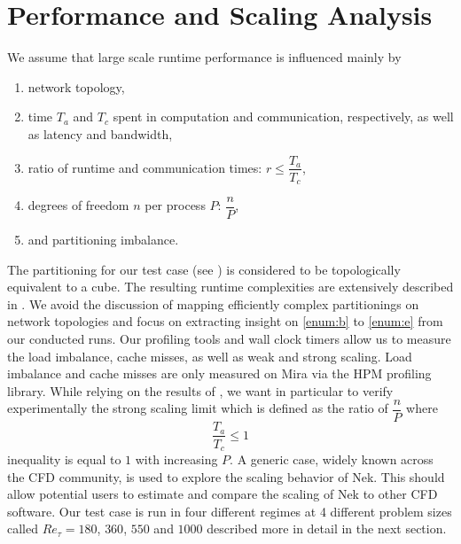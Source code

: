 \documentclass{sig-alternate}
\begin{document}



\section{Performance and Scaling Analysis}
\label{sec:analysis}
We assume that large scale runtime performance is influenced mainly by 
\begin{enumerate}
  \item network topology, \label{enum:a}
  \item time $T_a$ and $T_c$ spent in computation and communication,
    respectively, as well as latency and bandwidth\label{enum:b},
  \item ratio of runtime and communication times: $r \leq \dfrac{T_a}{T_c}$,\label{enum:c}
  \item degrees of freedom $n$ per process $P$: $\dfrac{n}{P}$,\label{enum:d}
  \item and partitioning imbalance.\label{enum:e}
\end{enumerate}

The partitioning for our test case (see ) is considered to be
topologically equivalent to a cube. The resulting runtime complexities are
extensively described in \cite{fischer:scaling}. We avoid the discussion of
mapping efficiently complex partitionings on network topologies and focus on
extracting insight on \ref{enum:b} to \ref{enum:e} from our conducted runs. Our
profiling tools and wall clock timers allow us to measure the load imbalance,
cache misses, as well as weak and strong scaling. Load imbalance and cache
misses are only measured on Mira via the HPM profiling library. 
While relying on the results of \cite{tufo:terascale}, we want in particular to verify
experimentally the strong scaling limit which is defined as the ratio of $\dfrac{n}{P}$ where
$$\dfrac{T_a}{T_c}\leq 1$$ inequality is equal to $1$ with increasing $P$. 
A generic case, widely known across the CFD community, is used to explore the
scaling behavior of Nek. This should allow potential users to estimate and
compare the scaling of Nek to other CFD software.
Our test case is run in four different regimes at 4 different problem sizes called
$Re_{\tau} = 180$, $360$, $550$ and $1000$ described more in
detail in the next section.
\end{document}
